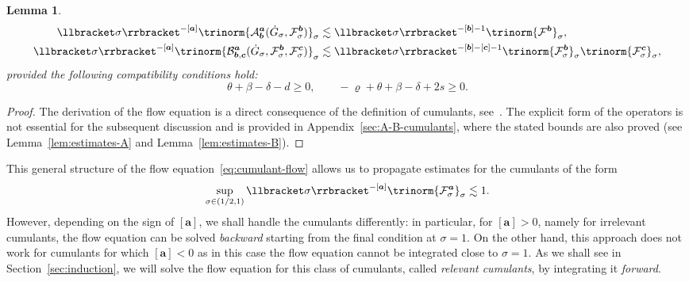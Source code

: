\documentclass{article}
\numberwithin{equation}{section}
\theoremstyle{plain}
\newtheorem{lemma}[theorem]{Lemma}
\theoremstyle{definition}
\begin{document}
\begin{lemma}
\[\begin{aligned}
       \llbracket \sigma \rrbracket^{- [\boldsymbol{a}]}  \trinorm{
       \mathcal{A}^{\boldsymbol{a}}_{\boldsymbol{b}} (\dot{G}_{\sigma},
       \mathcal{F}^{\boldsymbol{b}}_{\sigma}) }_{\sigma} & \lesssim
       \llbracket \sigma \rrbracket^{- [\boldsymbol{b}] - 1}  \trinorm{
       {\mathcal{F}^{\boldsymbol{b}}}  }_{\sigma},\\
       \llbracket \sigma \rrbracket^{- [\boldsymbol{a}]}  \trinorm{
       \mathcal{B}^{\boldsymbol{a}}_{\boldsymbol{b}, \boldsymbol{c}}
       (\dot{G}_{\sigma}, \mathcal{F}^{\boldsymbol{b}}_{\sigma},
       \mathcal{F}^{\boldsymbol{c}}_{\sigma}) }_{\sigma} & \lesssim
       \llbracket \sigma \rrbracket^{- [\boldsymbol{b}] - [\boldsymbol{c}] - 1}
       \trinorm{ \mathcal{F}^{\boldsymbol{b}}_{\sigma} }_{\sigma}
       \trinorm{ \mathcal{F}^{\boldsymbol{c}}_{\sigma} }_{\sigma},
     \end{aligned} \]
  provided the following compatibility conditions hold:
  \begin{equation}
    \theta + \beta - \delta - d \geqslant 0, \qquad - \varrho + \theta + \beta
    - \delta + 2 s \geqslant 0. \label{eq:compatibility}
  \end{equation}
\end{lemma}

\begin{proof}
  The derivation of the flow equation is a direct consequence of the
  definition of cumulants,
  see~{\cite{duchFlowEquationApproach2021,duchRenormalizationSingularElliptic2022}}.
  The explicit form of the operators is not essential for the subsequent
  discussion and is provided in Appendix~\ref{sec:A-B-cumulants}, where the
  stated bounds are also proved (see Lemma~\ref{lem:estimates-A} and
  Lemma~\ref{lem:estimates-B}).
\end{proof}

This general structure of the flow equation~\eqref{eq:cumulant-flow} allows us
to propagate estimates for the cumulants of the form
\[ \sup_{\sigma \in (1 / 2, 1)} \llbracket \sigma \rrbracket^{-
   [\boldsymbol{a}]}  \trinorm{ \mathcal{F}^{\boldsymbol{a}}_{\sigma}
   }_{\sigma} \lesssim 1 . \]
However, depending on the sign of $[\boldsymbol{a}]$, we shall handle
the cumulants differently: in particular, for $[\boldsymbol{a}] > 0$, namely for
irrelevant cumulants, the flow equation can be solved \textit{backward}
starting from the final condition at $\sigma = 1$. On the other hand, this
approach does not work for cumulants for which $[\boldsymbol{a}] < 0$ as in this
case the flow equation cannot be integrated close to $\sigma = 1$. As we shall
see in Section~\ref{sec:induction}, we will solve the flow equation for this
class of cumulants, called {\textit{relevant cumulants}}, by integrating it
{\textit{forward}}.
\end{document}

